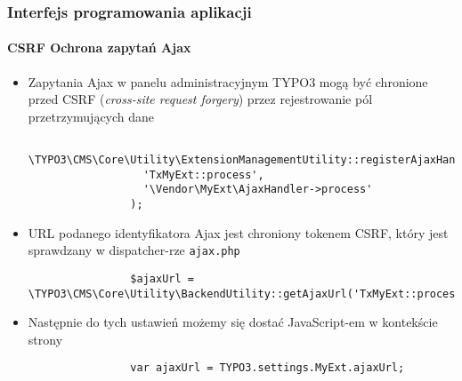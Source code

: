 \begin{frame}[fragile]
	\frametitle{Interfejs programowania aplikacji}
	\framesubtitle{CSRF Ochrona zapytań Ajax}

	\lstset{
		basicstyle=\tiny\ttfamily
	}

	\begin{itemize}
		\item Zapytania Ajax w panelu administracyjnym TYPO3 mogą być chronione przed CSRF (\textit{cross-site request forgery}) przez rejestrowanie pól przetrzymujących dane

			\begin{lstlisting}
				\TYPO3\CMS\Core\Utility\ExtensionManagementUtility::registerAjaxHandler(
				  'TxMyExt::process',
				  '\Vendor\MyExt\AjaxHandler->process'
				);
			\end{lstlisting}

		\item URL podanego identyfikatora Ajax jest chroniony tokenem CSRF, który jest sprawdzany w dispatcher-rze \texttt{ajax.php}

			\begin{lstlisting}
				$ajaxUrl = \TYPO3\CMS\Core\Utility\BackendUtility::getAjaxUrl('TxMyExt::process');
			\end{lstlisting}

		\item Następnie do tych ustawień możemy się dostać JavaScript-em w kontekście strony

			\begin{lstlisting}
				var ajaxUrl = TYPO3.settings.MyExt.ajaxUrl;
			\end{lstlisting}

	\end{itemize}

\end{frame}



